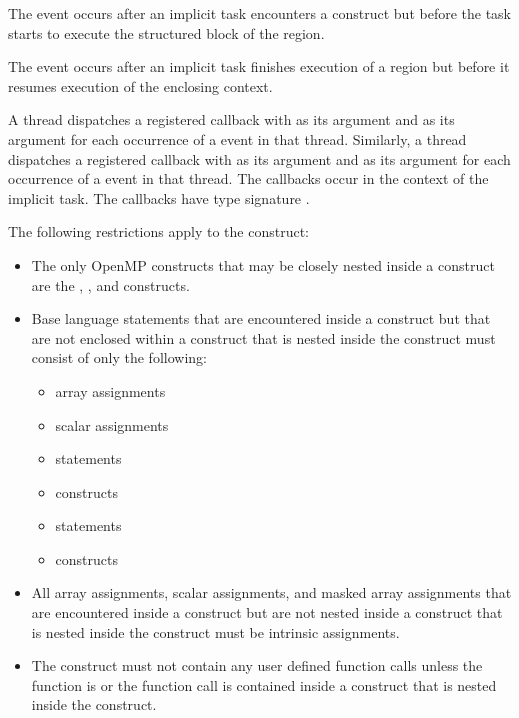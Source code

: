 \begin{fortranspecific}
\events

The  event occurs after an implicit task encounters a
 construct but before the task starts to execute the structured
block of the  region.

The  event occurs after an implicit task finishes execution of 
a  region but before it resumes execution of the enclosing context.

\tools

A thread dispatches a registered  callback with 
 as its  argument and  
as its  argument for each occurrence of a  event 
in that thread. Similarly, a thread dispatches a registered 
callback with  as its  argument and 
 as its  argument for each occurrence 
of a  event in that thread. The callbacks occur in the context 
of the implicit task. The callbacks have type signature .

\restrictions
The following restrictions apply to the  construct:

\begin{itemize}
\item The only OpenMP constructs that may be closely nested inside a 
      construct are the , , and  constructs.
\item Base language statements that are encountered inside a  construct
      but that are not enclosed within a  construct that is nested
      inside the  construct must consist of only the following: 

\begin{itemize}
\item array assignments
\item scalar assignments
\item {} statements
\item {} constructs
\item {} statements
\item {} constructs
\end{itemize}

\item All array assignments, scalar assignments, and masked array assignments 
      that are encountered inside a  construct but are not nested
      inside a  construct that is nested inside the 
      construct must be intrinsic assignments.
\item The construct must not contain any user defined function calls unless the 
      function is  or the function call is contained inside a 
       construct that is nested inside the  construct.
\end{itemize}


\end{fortranspecific}
